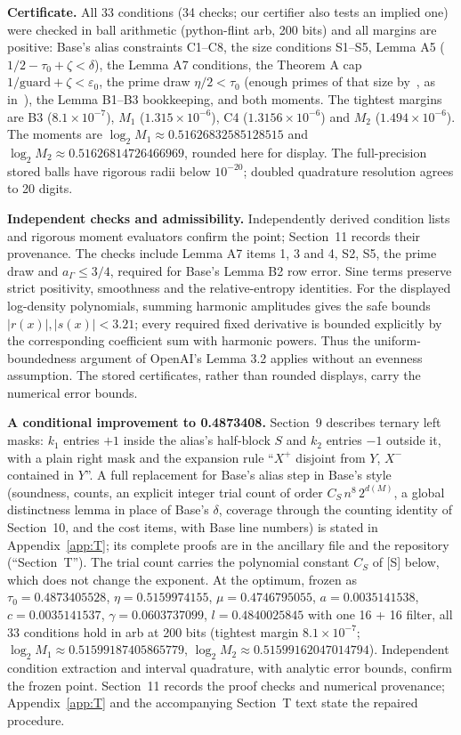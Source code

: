 \documentclass[11pt]{article}
\newcommand{\eps}{\varepsilon}
\theoremstyle{plain}
\begin{document}
\textbf{Certificate.} All 33 conditions (34 checks; our certifier also tests an implied one) were checked in ball arithmetic (python-flint arb, 200 bits) and all margins are positive: Base's alias constraints C1--C8, the size conditions S1--S5, Lemma A5 ($1/2 - \tau_0 + \zeta < \delta$), the Lemma A7 conditions, the Theorem A cap $1/\mathrm{guard} + \zeta < \eps_0$, the prime draw $\eta/2 < \tau_0$ (enough primes of that size by~\cite[Cor.~3]{rs}, as in~\cite{openai}), the Lemma B1--B3 bookkeeping, and both moments. The tightest margins are B3 ($8.1\times10^{-7}$), $M_1$ ($1.315\times10^{-6}$), C4 ($1.3156\times10^{-6}$) and $M_2$ ($1.494\times10^{-6}$). The moments are $\log_2 M_1\approx0.51626832585128515$ and $\log_2 M_2\approx0.51626814726466969$, rounded here for display. The full-precision stored balls have rigorous radii below $10^{-20}$; doubled quadrature resolution agrees to 20 digits.

\textbf{Independent checks and admissibility.} Independently derived condition lists and rigorous moment evaluators confirm the point; Section~11 records their provenance. The checks include Lemma A7 items 1, 3 and 4, S2, S5, the prime draw and $a_\Gamma\le3/4$, required for Base's Lemma B2 row error. Sine terms preserve strict positivity, smoothness and the relative-entropy identities. For the displayed log-density polynomials, summing harmonic amplitudes gives the safe bounds $|r(x)|,|s(x)|<3.21$; every required fixed derivative is bounded explicitly by the corresponding coefficient sum with harmonic powers. Thus the uniform-boundedness argument of OpenAI's Lemma 3.2 applies without an evenness assumption. The stored certificates, rather than rounded displays, carry the numerical error bounds.

\textbf{A conditional improvement to 0.4873408.} Section~9 describes ternary left masks: $k_1$ entries $+1$ inside the alias's half-block $S$ and $k_2$ entries $-1$ outside it, with a plain right mask and the expansion rule ``$X^+$ disjoint from $Y$, $X^-$ contained in $Y$''. A full replacement for Base's alias step in Base's style (soundness, counts, an explicit integer trial count of order $C_S\, n^8\, 2^{d(M)}$, a global distinctness lemma in place of Base's $\delta$, coverage through the counting identity of Section~10, and the cost items, with Base line numbers) is stated in Appendix~\ref{app:T}; its complete proofs are in the ancillary file and the repository (``Section~T''). The trial count carries the polynomial constant $C_S$ of [S] below, which does not change the exponent. At the optimum, frozen as $\tau_0 = 0.4873405528$, $\eta = 0.5159974155$, $\mu = 0.4746795055$, $a = 0.0035141538$, $c = 0.0035141537$, $\gamma = 0.0603737099$, $l = 0.4840025845$ with one 16 + 16 filter, all 33 conditions hold in arb at 200 bits (tightest margin $8.1\times10^{-7}$; $\log_2 M_1\approx0.51599187405865779$, $\log_2 M_2\approx0.51599162047014794$). Independent condition extraction and interval quadrature, with analytic error bounds, confirm the frozen point. Section~11 records the proof checks and numerical provenance; Appendix~\ref{app:T} and the accompanying Section~T text state the repaired procedure.
\end{document}
